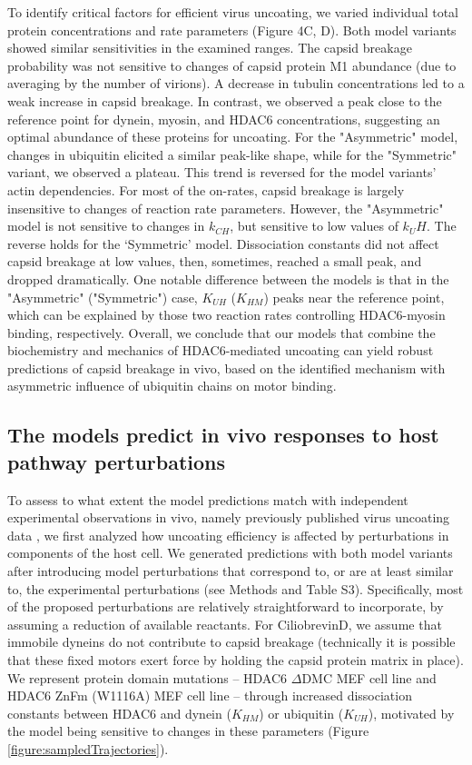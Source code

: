 To identify critical factors for efficient virus uncoating, we varied individual total protein concentrations and rate parameters (Figure 4C, D). Both model variants showed similar sensitivities in the examined ranges. The capsid breakage probability was not sensitive to changes of capsid protein M1 abundance (due to averaging by the number of virions). A decrease in tubulin concentrations led to a weak increase in capsid breakage. In contrast, we observed a peak close to the reference point for dynein, myosin, and HDAC6 concentrations, suggesting an optimal abundance of these proteins for uncoating. For the "Asymmetric" model, changes in ubiquitin elicited a similar peak-like shape, while for the "Symmetric" variant, we observed a plateau. This trend is reversed for the model variants’ actin dependencies. For most of the on-rates, capsid breakage is largely insensitive to changes of reaction rate parameters. However, the "Asymmetric" model is not sensitive to changes in  $k_{CH}$, but sensitive to low values of $k_UH$. The reverse holds for the ‘Symmetric’ model. Dissociation constants did not affect capsid breakage at low values, then, sometimes, reached a small peak, and dropped dramatically. One notable difference between the models is that in the "Asymmetric" ("Symmetric") case, $K_{UH}$ ($K_{HM}$) peaks near the reference point, which can be explained by those two reaction rates controlling HDAC6-myosin binding, respectively. Overall, we conclude that our models that combine the biochemistry and mechanics of HDAC6-mediated uncoating can yield robust predictions of capsid breakage in vivo, based on the identified mechanism with asymmetric influence of ubiquitin chains on motor binding.

\subsection{The models predict in vivo responses to host pathway perturbations}

To assess to what extent the model predictions match with independent experimental observations in vivo, namely previously published virus uncoating data \cite{banerjee2014influenza}, we first analyzed how uncoating efficiency is affected by perturbations in components of the host cell. We generated predictions with both model variants after introducing model perturbations that correspond to, or are at least similar to, the experimental perturbations (see Methods and Table S3). Specifically, most of the proposed perturbations are relatively straightforward to incorporate, by assuming a reduction of available reactants. For CiliobrevinD, we assume that immobile dyneins do not contribute to capsid breakage (technically it is possible that these fixed motors exert force by holding the capsid protein matrix in place). We represent protein domain mutations – HDAC6 $\Delta$DMC MEF cell line and HDAC6 ZnFm (W1116A) MEF cell line – through increased dissociation constants between HDAC6 and dynein ($K_{HM}$) or ubiquitin ($K_{UH}$), motivated by the model being sensitive to changes in these parameters (Figure \ref{figure:sampledTrajectories}).


